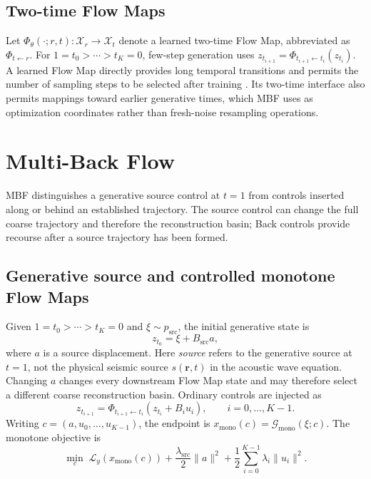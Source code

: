 \documentclass[10pt,twocolumn]{article}
\begin{document}
\subsection{Two-time Flow Maps}
Let $\Phi_\theta(\cdot;r,t):\mathcal X_r\to\mathcal X_t$ denote a learned two-time Flow Map, abbreviated as $\Phi_{t\leftarrow r}$. For $1=t_0>\cdots>t_K=0$, few-step generation uses $z_{t_{i+1}}=\Phi_{t_{i+1}\leftarrow t_i}(z_{t_i})$. A learned Flow Map directly provides long temporal transitions and permits the number of sampling steps to be selected after training \cite{boffi2024flowmap}. Its two-time interface also permits mappings toward earlier generative times, which MBF uses as optimization coordinates rather than fresh-noise resampling operations.

\section{Multi-Back Flow}
MBF distinguishes a generative source control at $t=1$ from controls inserted along or behind an established trajectory. The source control can change the full coarse trajectory and therefore the reconstruction basin; Back controls provide recourse after a source trajectory has been formed.

\subsection{Generative source and controlled monotone Flow Maps}
Given $1=t_0>\cdots>t_K=0$ and $\xi\sim p_{\mathrm{src}}$, the initial generative state is
\begin{equation}
z_{t_0}=\xi+B_{\mathrm{src}}a,
\end{equation}
where $a$ is a source displacement. Here \emph{source} refers to the generative source at $t=1$, not the physical seismic source $s(\mathbf r,t)$ in the acoustic wave equation. Changing $a$ changes every downstream Flow Map state and may therefore select a different coarse reconstruction basin. Ordinary controls are injected as
\begin{equation}
z_{t_{i+1}}=\Phi_{t_{i+1}\leftarrow t_i}(z_{t_i}+B_i u_i),\qquad i=0,\ldots,K-1.
\end{equation}
Writing $c=(a,u_0,\ldots,u_{K-1})$, the endpoint is $x_{\mathrm{mono}}(c)=\mathcal G_{\mathrm{mono}}(\xi;c)$. The monotone objective is
\begin{equation}
\min_c\;\mathcal L_y(x_{\mathrm{mono}}(c))+\frac{\lambda_{\mathrm{src}}}{2}\|a\|^2+\frac12\sum_{i=0}^{K-1}\lambda_i\|u_i\|^2.
\end{equation}
\end{document}
